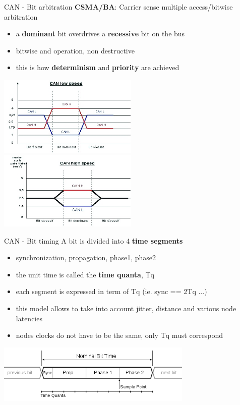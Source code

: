 \begin{frame}{CAN - Bit arbitration}
  \textbf{CSMA/BA}: Carrier sense multiple access/bitwise arbitration
  \begin{itemize}
    \item a \textbf{dominant} bit overdrives a \textbf{recessive} bit on the bus
    \item bitwise and operation, non destructive
    \item this is how \textbf{determinism} and \textbf{priority} are achieved
  \end{itemize}

  \smallskip
  \begin{center}
    \includegraphics[width=0.5\textwidth]{figures/can_bit_lowspeed_levels.jpg}
    \includegraphics[width=0.5\textwidth]{figures/can_bit_highspeed_levels.jpg}
  \end{center}
\end{frame}

\begin{frame}{CAN - Bit timing}
  A bit is divided into 4 \textbf{time segments}
  \begin{itemize}
  \item synchronization, propagation, phase1, phase2
  \item the unit time is called the \textbf{time quanta}, Tq
  \item each segment is expressed in term of Tq (ie. sync == 2Tq ...)
  \item this model allows to take into account jitter, distance and various node latencies
  \item nodes clocks do not have to be the same, only Tq must correspond
  \end{itemize}

  \smallskip
  \begin{center}
    \includegraphics[width=0.7\textwidth]{figures/bit_timing.png}
  \end{center}
\end{frame}

